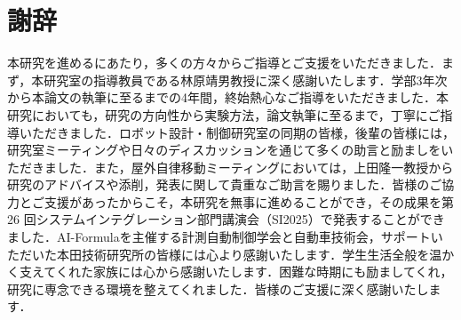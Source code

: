 \chapter*{謝辞}

本研究を進めるにあたり，多くの方々からご指導とご支援をいただきました．まず，本研究室の指導教員である林原靖男教授に深く感謝いたします．学部3年次から本論文の執筆に至るまでの4年間，終始熱心なご指導をいただきました．本研究においても，研究の方向性から実験方法，論文執筆に至るまで，丁寧にご指導いただきました．ロボット設計・制御研究室の同期の皆様，後輩の皆様には，研究室ミーティングや日々のディスカッションを通じて多くの助言と励ましをいただきました．また，屋外自律移動ミーティングにおいては，上田隆一教授から研究のアドバイスや添削，発表に関して貴重なご助言を賜りました．皆様のご協力とご支援があったからこそ，本研究を無事に進めることができ，その成果を第 26 回システムインテグレーション部門講演会（SI2025）で発表することができました．AI-Formulaを主催する計測自動制御学会と自動車技術会，サポートいただいた本田技術研究所の皆様には心より感謝いたします．学生生活全般を温かく支えてくれた家族には心から感謝いたします．困難な時期にも励ましてくれ，研究に専念できる環境を整えてくれました．皆様のご支援に深く感謝いたします．
